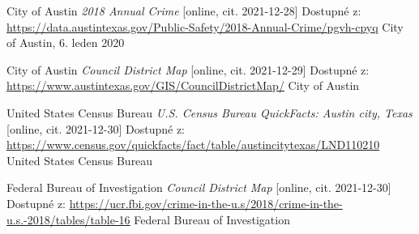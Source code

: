 \documentclass{article}
\begin{document}
\clearpage

\begin{thebibliography}{50}

City of Austin \textit{2018 Annual Crime} [online, cit. 2021-12-28]
Dostupné z: \url{https://data.austintexas.gov/Public-Safety/2018-Annual-Crime/pgvh-cpyq} 
City of Austin, 6. leden 2020

City of Austin \textit{Council District Map} [online, cit. 2021-12-29]
Dostupné z: \url{https://www.austintexas.gov/GIS/CouncilDistrictMap/} 
City of Austin

United States Census Bureau \textit{U.S. Census Bureau QuickFacts: Austin city, Texas} [online, cit. 2021-12-30]
Dostupné z: \url{https://www.census.gov/quickfacts/fact/table/austincitytexas/LND110210} 
United States Census Bureau

Federal Bureau of Investigation \textit{Council District Map} [online, cit. 2021-12-30]
Dostupné z: \url{https://ucr.fbi.gov/crime-in-the-u.s/2018/crime-in-the-u.s.-2018/tables/table-16} 
Federal Bureau of Investigation

\end{thebibliography}
\end{document}
